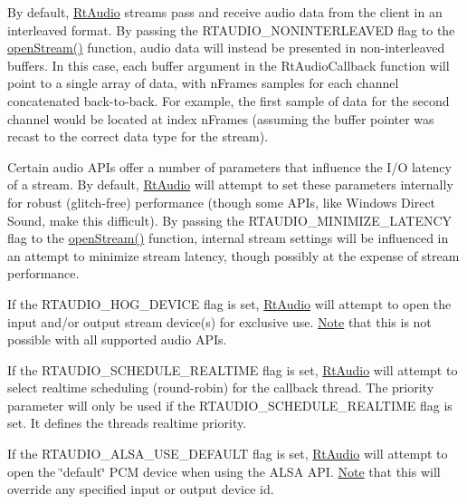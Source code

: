 By default, \hyperlink{class_rt_audio}{Rt\+Audio} streams pass and receive audio data from the client in an interleaved format. By passing the R\+T\+A\+U\+D\+I\+O\+\_\+\+N\+O\+N\+I\+N\+T\+E\+R\+L\+E\+A\+V\+ED flag to the \hyperlink{class_rt_audio_a6907539d2527775df778ebce32ef1e3b}{open\+Stream()} function, audio data will instead be presented in non-\/interleaved buffers. In this case, each buffer argument in the Rt\+Audio\+Callback function will point to a single array of data, with {\ttfamily n\+Frames} samples for each channel concatenated back-\/to-\/back. For example, the first sample of data for the second channel would be located at index {\ttfamily n\+Frames} (assuming the {\ttfamily buffer} pointer was recast to the correct data type for the stream).

Certain audio A\+P\+Is offer a number of parameters that influence the I/O latency of a stream. By default, \hyperlink{class_rt_audio}{Rt\+Audio} will attempt to set these parameters internally for robust (glitch-\/free) performance (though some A\+P\+Is, like Windows Direct Sound, make this difficult). By passing the R\+T\+A\+U\+D\+I\+O\+\_\+\+M\+I\+N\+I\+M\+I\+Z\+E\+\_\+\+L\+A\+T\+E\+N\+CY flag to the \hyperlink{class_rt_audio_a6907539d2527775df778ebce32ef1e3b}{open\+Stream()} function, internal stream settings will be influenced in an attempt to minimize stream latency, though possibly at the expense of stream performance.

If the R\+T\+A\+U\+D\+I\+O\+\_\+\+H\+O\+G\+\_\+\+D\+E\+V\+I\+CE flag is set, \hyperlink{class_rt_audio}{Rt\+Audio} will attempt to open the input and/or output stream device(s) for exclusive use. \hyperlink{class_note}{Note} that this is not possible with all supported audio A\+P\+Is.

If the R\+T\+A\+U\+D\+I\+O\+\_\+\+S\+C\+H\+E\+D\+U\+L\+E\+\_\+\+R\+E\+A\+L\+T\+I\+ME flag is set, \hyperlink{class_rt_audio}{Rt\+Audio} will attempt to select realtime scheduling (round-\/robin) for the callback thread. The {\ttfamily priority} parameter will only be used if the R\+T\+A\+U\+D\+I\+O\+\_\+\+S\+C\+H\+E\+D\+U\+L\+E\+\_\+\+R\+E\+A\+L\+T\+I\+ME flag is set. It defines the thread\textquotesingle{}s realtime priority.

If the R\+T\+A\+U\+D\+I\+O\+\_\+\+A\+L\+S\+A\+\_\+\+U\+S\+E\+\_\+\+D\+E\+F\+A\+U\+LT flag is set, \hyperlink{class_rt_audio}{Rt\+Audio} will attempt to open the \char`\"{}default\char`\"{} P\+CM device when using the A\+L\+SA A\+PI. \hyperlink{class_note}{Note} that this will override any specified input or output device id.

